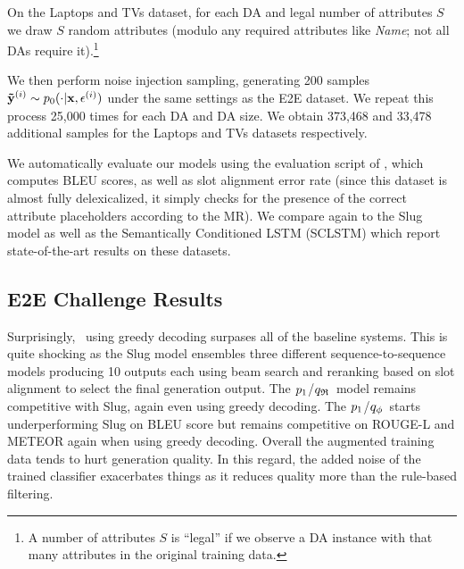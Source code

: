 On the Laptops and TVs dataset,
for each DA and legal number of attributes $S$ we draw $S$ random attributes
(modulo any required attributes like \textit{Name}; not all DAs require it).\footnote{A number of attributes $S$ is ``legal'' if we observe a DA instance with that 
many attributes in the original training data.}

We then perform noise injection sampling,
generating 200 samples $\boldsymbol{\tilde{\mathbf{y}}}^{(i)} \sim 
p_0(\cdot|\mathbf{x}, \epsilon^{(i)})$ under the same settings as the E2E
dataset. We repeat this process 25,000 times for each DA and DA size.
We obtain 373,468 and 33,478 additional samples for the Laptops 
and TVs datasets respectively.


We automatically evaluate our models using the evaluation script of
\citet{wen2016multi}, which computes BLEU scores, as well as slot
alignment error rate (since this dataset is almost fully delexicalized,
it simply checks for the presence of the correct attribute placeholders
according to the MR). We compare again to the Slug model as well
as the Semantically Conditioned LSTM (SCLSTM) \cite{wen2015semantically}
which report state-of-the-art results on these datasets.








\subsection{E2E Challenge Results}

Surprisingly, \basegen~using greedy decoding surpases all of the 
baseline systems. This is quite shocking as the Slug model ensembles
three different sequence-to-sequence models producing 10 outputs each using beam search and reranking based on slot alignment to select the final generation
output. The $p_1$/${q_{\mathfrak{R}} }$~model remains competitive with Slug, 
again even using greedy decoding.
The $p_1$/${q_{\phi} }$~starts underperforming Slug on BLEU score but
remains competitive on ROUGE-L and METEOR again when using greedy decoding.
Overall the augmented training data tends to hurt generation quality.
In this regard, the added noise of the trained classifier exacerbates things
as it reduces quality more than the rule-based filtering. 

